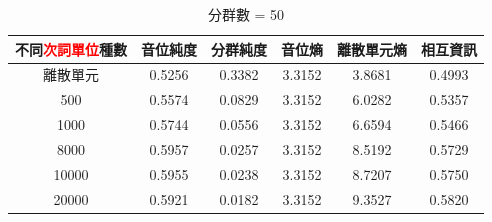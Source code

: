   {  %
    {
        \begin{table}[!htbp]
            \centering

            \begin{subtable}[t]{\textwidth}
                \centering
                \begin{tabular}{|c|c|c|c|c|c|} \hline
                    不同\textcolor{red}{次詞單位}種數 & 音位純度   & 分群純度   & 音位熵    & 離散單元熵  & 相互資訊   \\ \hline
                                             離散單元 &     0.5256 &     0.3382 &    3.3152 &      3.8681 &     0.4993 \\ \hline
                                                 500  &     0.5574 &     0.0829 &    3.3152 &      6.0282 &     0.5357 \\ \hline %
                                                1000  &     0.5744 &     0.0556 &    3.3152 &      6.6594 &     0.5466 \\ \hline %
                                                8000  &     0.5957 &     0.0257 &    3.3152 &      8.5192 &     0.5729 \\ \hline %
                                               10000  &     0.5955 &     0.0238 &    3.3152 &      8.7207 &     0.5750 \\ \hline %
                                               20000  &     0.5921 &     0.0182 &    3.3152 &      9.3527 &     0.5820 \\ \hline %
                \end{tabular}
                \caption{分群數 = 50}
                \label{tab:ch4-hubert-phn-clu050-}
            \end{subtable}

            \vspace{0.5cm}
            

\end{table}}}
